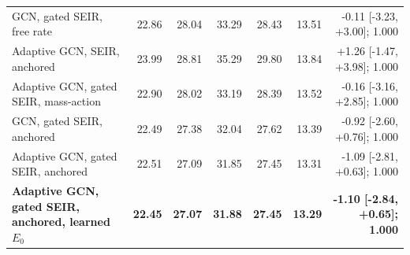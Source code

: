 \begin{table}[t]
\begin{tabular}{@{}p{2.85in}rrrrrr@{}}
GCN, gated SEIR, free rate & 22.86 & 28.04 & 33.29 & 28.43 & 13.51 & -0.11 [-3.23, +3.00]; 1.000 \\ %

Adaptive GCN, SEIR, anchored & 23.99 & 28.81 & 35.29 & 29.80 & 13.84 & +1.26 [-1.47, +3.98]; 1.000 \\ %

Adaptive GCN, gated SEIR, mass-action & 22.90 & 28.02 & 33.19 & 28.39 & 13.52 & -0.16 [-3.16, +2.85]; 1.000 \\ %

GCN, gated SEIR, anchored & 22.49 & 27.38 & 32.04 & 27.62 & 13.39 & -0.92 [-2.60, +0.76]; 1.000 \\ %

Adaptive GCN, gated SEIR, anchored & 22.51 & 27.09 & 31.85 & 27.45 & 13.31 & -1.09 [-2.81, +0.63]; 1.000 \\ %

\textbf{Adaptive GCN, gated SEIR, anchored, learned $E_0$} & \textbf{22.45} & \textbf{27.07} & \textbf{31.88} & \textbf{27.45} & \textbf{13.29} & \textbf{-1.10 [-2.84, +0.65]; 1.000} \\ %

\bottomrule
\end{tabular}
\end{table}
